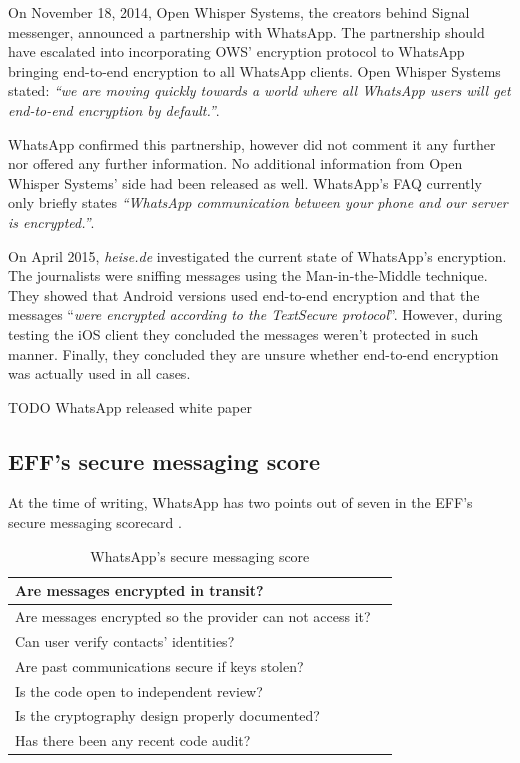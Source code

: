\documentclass[thesis=M,english]{FITthesis}[2012/10/20]
\newcommand{\cmark}{\ding{51}}%
\newcommand{\xmark}{\ding{55}}%
\begin{document}
On November 18, 2014, Open Whisper Systems, the creators behind Signal messenger, announced a partnership with WhatsApp. The partnership should have escalated into incorporating OWS' encryption protocol to WhatsApp bringing end-to-end encryption to all WhatsApp clients. Open Whisper Systems stated: \emph{``we are moving quickly towards a world where all WhatsApp users will get end-to-end encryption by default.''}. \cite{openwhisperwhatsapp}

WhatsApp confirmed this partnership, however did not comment it any further nor offered any further information. No additional information from Open Whisper Systems' side had been released as well. WhatsApp's FAQ currently only briefly states \emph{``WhatsApp communication between your phone and our server is encrypted.''}\cite{whatsapp-faq}.

On April 2015, \emph{heise.de} investigated the current state of WhatsApp's encryption. The journalists were sniffing messages using the Man-in-the-Middle technique. They showed that Android versions used end-to-end encryption and that the messages ``\emph{were encrypted according to the TextSecure protocol}''\cite{whatsapp-encstate}. However, during testing the iOS client they concluded the messages weren't protected in such manner. Finally, they concluded they are unsure whether end-to-end encryption was actually used in all cases.

TODO WhatsApp released white paper

\subsection{EFF's secure messaging score}

At the time of writing, WhatsApp has two points out of seven in the EFF's secure messaging scorecard \cite{eff-score}.

\begin{table}[htb]
	\centering
	\caption{WhatsApp's secure messaging score}
	\label{my-label}
	\begin{tabular}{|l|l|}
		\hline
		Are messages encrypted in transit? & \cmark \\\hline
		Are messages encrypted so the provider can not access it? & \xmark \\ \hline
		Can user verify contacts' identities? & \xmark \\ \hline
		Are past communications secure if keys stolen? & \xmark \\ \hline
		Is the code open to independent review? & \xmark \\ \hline
		Is the cryptography design properly documented? & \xmark \\ \hline
		Has there been any recent code audit? & \cmark \\ \hline
	\end{tabular}
\end{table}
\end{document}
